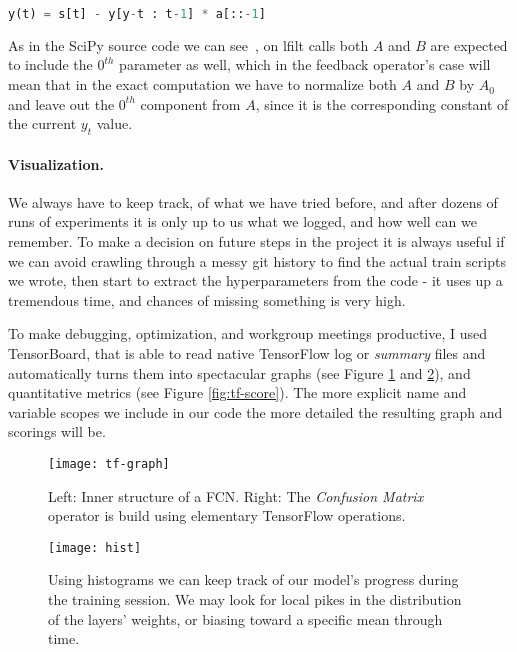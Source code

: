 \begin{lstlisting}[language=Python]
y(t) = s[t] - y[y-t : t-1] * a[::-1]
\end{lstlisting}

As in the SciPy source code we can see~\cite{noauthor_scipy/scipy_nodate}, on lfilt calls both $A$ and $B$ are expected to include the $0^{th}$ parameter as well, which in the feedback operator's case will mean that in the exact computation we have to normalize both $A$ and $B$ by $A_0$ and leave out the $0^{th}$ component from $A$, since it is the corresponding constant of the current $y_t$ value.

\paragraph{Visualization.}
We always have to keep track, of what we have tried before, and after dozens of runs of experiments it is only up to us what we logged, and how well can we remember.
To make a decision on future steps in the project it is always useful if we can avoid crawling through a messy git history to find the actual train scripts we wrote, then start to extract the hyperparameters from the code - it uses up a tremendous time, and chances of missing something is very high.

To make debugging, optimization, and workgroup meetings productive, I used TensorBoard, that is able to read native TensorFlow log or \textit{summary} files and automatically turns them into spectacular graphs (see Figure \ref{fig:tf-graph} and \ref{fig:hist}), and quantitative metrics (see Figure \ref{fig:tf-score}).
The more explicit name and variable scopes we include in our code the more detailed the resulting graph and scorings will be.

\begin{figure}[h]
  \centering
  \texttt{[image: tf-graph]}
  \caption{Left: Inner structure of a FCN. Right: The \textit{Confusion Matrix} operator is build using elementary TensorFlow operations.}
  \label{fig:tf-graph}
\end{figure}

\begin{figure}[h]
  \centering
  \texttt{[image: hist]}
  \caption{Using histograms we can keep track of our model's progress during the training session. We may look for local pikes in the distribution of the layers' weights, or biasing toward a specific mean through time.}
  \label{fig:hist}
\end{figure}

